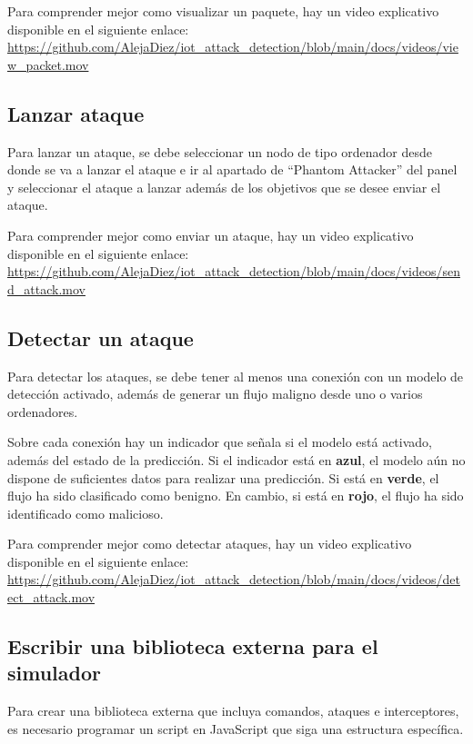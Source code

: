 Para comprender mejor como visualizar un paquete, hay un video explicativo disponible en el siguiente enlace: \url{https://github.com/AlejaDiez/iot_attack_detection/blob/main/docs/videos/view_packet.mov}

\subsection{Lanzar ataque}
\label{subsec:LanzarAtaque}
Para lanzar un ataque, se debe seleccionar un nodo de tipo ordenador desde donde se va a lanzar el ataque e ir al apartado de ``Phantom Attacker'' del panel y seleccionar el ataque a lanzar además de los objetivos que se desee enviar el ataque.


Para comprender mejor como enviar un ataque, hay un video explicativo disponible en el siguiente enlace: \url{https://github.com/AlejaDiez/iot_attack_detection/blob/main/docs/videos/send_attack.mov}

\subsection{Detectar un ataque}
\label{subsec:DetectarAtaque}
Para detectar los ataques, se debe tener al menos una conexión con un modelo de detección activado, además de generar un flujo maligno desde uno o varios ordenadores.


Sobre cada conexión hay un indicador que señala si el modelo está activado, además del estado de la predicción. Si el indicador está en \textbf{azul}, el modelo aún no dispone de suficientes datos para realizar una predicción. Si está en \textbf{verde}, el flujo ha sido clasificado como benigno. En cambio, si está en \textbf{rojo}, el flujo ha sido identificado como malicioso.

Para comprender mejor como detectar ataques, hay un video explicativo disponible en el siguiente enlace: \url{https://github.com/AlejaDiez/iot_attack_detection/blob/main/docs/videos/detect_attack.mov}

\subsection{Escribir una biblioteca externa para el simulador}
\label{subsec:BibliotecaExterna}
Para crear una biblioteca externa que incluya comandos, ataques e interceptores, es necesario programar un script en JavaScript que siga una estructura específica. 

